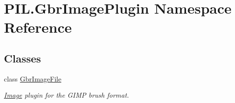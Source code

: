 \hypertarget{namespacePIL_1_1GbrImagePlugin}{}\section{P\+I\+L.\+Gbr\+Image\+Plugin Namespace Reference}
\label{namespacePIL_1_1GbrImagePlugin}
\subsection*{Classes}
\begin{DoxyCompactItemize}
\item 
class \hyperlink{classPIL_1_1GbrImagePlugin_1_1GbrImageFile}{Gbr\+Image\+File}
\begin{DoxyCompactList}\small\item\em \hyperlink{namespacePIL_1_1Image}{Image} plugin for the G\+I\+MP brush format. \end{DoxyCompactList}\end{DoxyCompactItemize}
